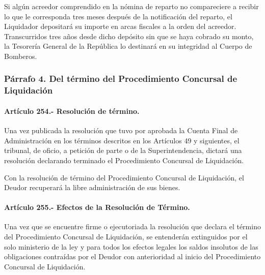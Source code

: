 \documentclass[
]{book}
\begin{document}
Si algún acreedor comprendido en la nómina de reparto no compareciere a recibir lo que le corresponda tres meses después de la notificación del reparto, el Liquidador depositará su importe en arcas fiscales a la orden del acreedor. Transcurridos tres años desde dicho depósito sin que se haya cobrado su monto, la Tesorería General de la República lo destinará en su integridad al Cuerpo de Bomberos.

\hypertarget{puxe1rrafo-4.-del-tuxe9rmino-del-procedimiento-concursal-de-liquidaciuxf3n}{%
\subsubsection*{Párrafo 4. Del término del Procedimiento Concursal de Liquidación}\label{puxe1rrafo-4.-del-tuxe9rmino-del-procedimiento-concursal-de-liquidaciuxf3n}}

\hypertarget{artuxedculo-254.--resoluciuxf3n-de-tuxe9rmino.}{%
\paragraph*{Artículo 254.- Resolución de término.}\label{artuxedculo-254.--resoluciuxf3n-de-tuxe9rmino.}}

Una vez publicada la resolución que tuvo por aprobada la Cuenta Final de Administración en los términos descritos en los Artículos 49 y siguientes, el tribunal, de oficio, a petición de parte o de la Superintendencia, dictará una resolución declarando terminado el Procedimiento Concursal de Liquidación.

Con la resolución de término del Procedimiento Concursal de Liquidación, el Deudor recuperará la libre administración de sus bienes.

\hypertarget{artuxedculo-255.--efectos-de-la-resoluciuxf3n-de-tuxe9rmino.}{%
\paragraph*{Artículo 255.- Efectos de la Resolución de Término.}\label{artuxedculo-255.--efectos-de-la-resoluciuxf3n-de-tuxe9rmino.}}

Una vez que se encuentre firme o ejecutoriada la resolución que declara el término del Procedimiento Concursal de Liquidación, se entenderán extinguidos por el solo ministerio de la ley y para todos los efectos legales los saldos insolutos de las obligaciones contraídas por el Deudor con anterioridad al inicio del Procedimiento Concursal de Liquidación.
\end{document}
